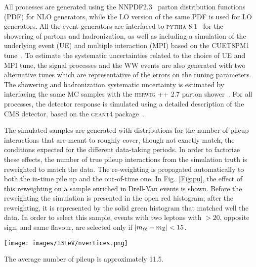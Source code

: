 All processes are generated using the NNPDF2.3~\cite{Ball:2013hta,Ball:2011uy} parton distribution functions (PDF) for NLO generators,
while the LO version of the same PDF is used for LO generators. All the event generators are interfaced 
to \textsc{pythia} 8.1~\cite{Sjostrand:2007gs} for the showering of
partons and hadronization, as well as including a simulation of the underlying event (UE) and multiple interaction (MPI)
based on the CUET8PM1 tune~\cite{Khachatryan:2015pea}. 
%
To estimate the systematic uncertainties related to the choice of UE and MPI tune, the signal processes and the WW
events are also generated with two alternative tunes which are representative of the errors on the tuning parameters.
The showering and hadronization systematic uncertainty is estimated by interfacing the same MC samples with the 
\textsc{herwig ++} 2.7 parton shower~\cite{Richardson:2013nfo,Bellm:2013hwb}.
%
For all processes, the detector response is simulated using a detailed
description of the CMS detector, based on the \textsc{geant4} package~\cite{Agostinelli:2002hh}. 

The simulated samples are generated with distributions for the number of pileup interactions that are meant to roughly cover,
though not exactly match, the conditions expected for the different data-taking periods. In order to factorize these effects, 
the number of true pileup interactions from the simulation truth is reweighted to match the data.
The re-weighting is propagated automatically to both the in-time pile up and the out-of-time one.
In Fig.~\ref{Fig:pu}, the effect of this reweighting on a sample enriched in Drell-Yan events is shown.
Before the reweighting the simulation is presented in the open red histogram; after the reweighting,
it is represented by the solid green histogram that matched well the data. In order to select this sample, 
events with two leptons with \pt$> 20$\GeV, opposite sign, and same flavour, are selected only if  $|m_{\ell\ell} - m_\mathrm{Z}| < 15$\GeV. 

\begin{figure*}[htbp]
\centering
\texttt{[image: images/13TeV/nvertices.png]}
\caption{
    Distributions of the number of vertices in a Drell-Yan enriched sample in data,
    together with the simulation before (red) and after (solid green) the pileup reweighting. }
    \label{Fig:pu}
\end{figure*}

The average number of pileup is approximately 11.5.


